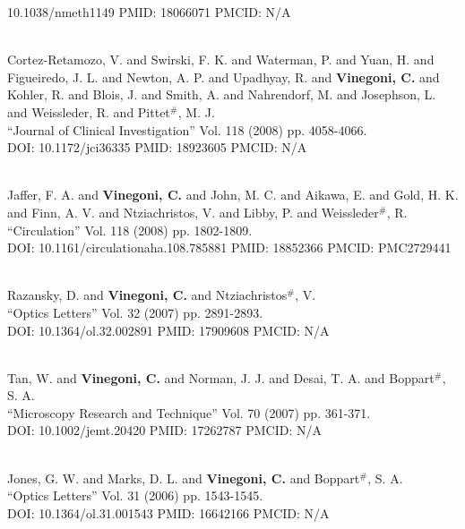 10.1038/nmeth1149 PMID: 18066071 PMCID: N/A\item {} \\ Cortez-Retamozo, V. and Swirski, F. K. and Waterman, P. and Yuan, H. and Figueiredo, J. L. and Newton, A. P. and Upadhyay, R. and {\bf Vinegoni, C.} and Kohler, R. and Blois, J. and Smith, A. and Nahrendorf, M. and Josephson, L. and Weissleder, R. and Pittet$^\#$, M. J. \\ ``Journal of Clinical Investigation'' Vol. 118 (2008) pp. 4058-4066. \\ DOI: 10.1172/jci36335 PMID: 18923605 PMCID: N/A\item {} \\ Jaffer, F. A. and {\bf Vinegoni, C.} and John, M. C. and Aikawa, E. and Gold, H. K. and Finn, A. V. and Ntziachristos, V. and Libby, P. and Weissleder$^\#$, R. \\ ``Circulation'' Vol. 118 (2008) pp. 1802-1809. \\ DOI: 10.1161/circulationaha.108.785881 PMID: 18852366 PMCID: PMC2729441\item {} \\ Razansky, D. and {\bf Vinegoni, C.} and Ntziachristos$^\#$, V. \\ ``Optics Letters'' Vol. 32 (2007) pp. 2891-2893. \\ DOI: 10.1364/ol.32.002891 PMID: 17909608 PMCID: N/A\item {} \\ Tan, W. and {\bf Vinegoni, C.} and Norman, J. J. and Desai, T. A. and Boppart$^\#$, S. A. \\ ``Microscopy Research and Technique'' Vol. 70 (2007) pp. 361-371. \\ DOI: 10.1002/jemt.20420 PMID: 17262787 PMCID: N/A\item {} \\ Jones, G. W. and Marks, D. L. and {\bf Vinegoni, C.} and Boppart$^\#$, S. A. \\ ``Optics Letters'' Vol. 31 (2006) pp. 1543-1545. \\ DOI: 10.1364/ol.31.001543 PMID: 16642166 PMCID: N/A\item {} \\ 